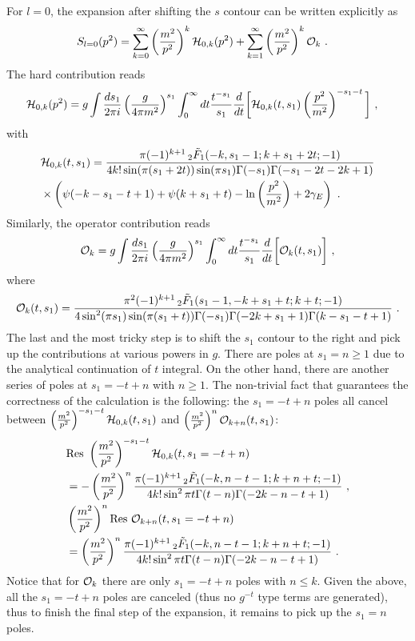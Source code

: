 \documentclass[a4paper,11pt]{article}
\begin{document}
For $l=0$, the expansion after shifting the $s$ contour  can be written explicitly as 
\begin{align}
&S_{l=0}(p^2)=\sum_{k=0}^{\infty}\left(\frac{m^2}{p^2}\right)^k{\cal H}_{0,k}(p^2)+\sum_{k=1}^{\infty}\left(\frac{m^2}{p^2}\right)^k{\cal O}_{k} \ .  
\end{align}
The hard contribution reads
\begin{align}
& {\cal H}_{0,k}(p^2)=g\int\frac{ds_1}{2\pi i}\left(\frac{g}{4\pi m^2}\right)^{s_1}\int_0^{\infty} dt \frac{t^{-s_1}}{s_1}\frac{d}{dt}\bigg[{\cal H}_{0,k}(t,s_1)\left(\frac{p^2}{m^2}\right)^{-s_1-t}\bigg] \ ,
\end{align}
with
\begin{align}
&{\cal H}_{0,k}(t,s_1)=\frac{ \pi  (-1)^{k+1}  \, _2\tilde{F}_1(-k,s_1-1;k+s_1+2 t;-1) }{4k!\sin(\pi  (s_1+2 t)) \sin (\pi  s_1) \Gamma (-s_1) \Gamma (-s_1-2t -2k+1)} \nonumber \\ 
& \times   \left(\psi(-k-s_1-t+1)+\psi (k+s_1+t)-\ln \left(\frac{p^2}{m^2}\right)+2 \gamma_E \right) \ . 
\end{align}
Similarly, the operator contribution reads
\begin{align}
 {\cal O}_{k}=g\int\frac{ds_1}{2\pi i}\left(\frac{g}{4\pi m^2}\right)^{s_1}\int_0^{\infty} dt \frac{t^{-s_1}}{s_1}\frac{d}{dt}\bigg[{\cal O}_{k}(t,s_1)\bigg] \ ,
\end{align}
where
\begin{align}
{\cal O}_{k}(t,s_1)=\frac{\pi ^2 (-1)^{k+1}  \, _2\tilde{F}_1(s_1-1,-k+s_1+t;k+t;-1)}{4\sin^2 (\pi s_1)\sin (\pi(s_1+t))\Gamma (-s_1) \Gamma (-2 k+s_1+1) \Gamma (k-s_1-t+1)} \ . \label{eq:defOkts}
\end{align}
The last and the most tricky step is to shift the $s_1$ contour to the right and pick up the contributions at various powers in $g$. There are poles at $s_1=n\ge 1$ due to the analytical continuation of $t$ integral. On the other hand, there are another series of poles at $s_1=-t+n$ with $n\ge 1$. The non-trivial fact that guarantees the correctness of the calculation is the following: the $s_1=-t+n$ poles all cancel between $\left(\frac{m^2}{p^2}\right)^{-s_1-t}{\cal H}_{0,k}(t,s_1)$ and $\left(\frac{m^2}{p^2}\right)^{n}{\cal O}_{k+n}(t,s_1)$:
\begin{align}
&{\rm Res} \ \left(\frac{m^2}{p^2}\right)^{-s_1-t} {\cal H}_{0,k}(t,s_1=-t+n)\nonumber \\ 
&=-\left(\frac{m^2}{p^2}\right)^n\frac{\pi  (-1)^{k+1}  \, _2\tilde{F}_1(-k,n-t-1;k+n+t;-1)}{4 k! \sin^2\pi t\Gamma (t-n) \Gamma (-2 k-n-t+1)} \ , \\ 
& \left(\frac{m^2}{p^2}\right)^n {\rm Res} \ {\cal O}_{k+n}(t,s_1=-t+n) \nonumber \\ 
&=\left(\frac{m^2}{p^2}\right)^n\frac{\pi  (-1)^{k+1}  \, _2\tilde{F}_1(-k,n-t-1;k+n+t;-1)}{4 k! \sin^2\pi t\Gamma (t-n) \Gamma (-2 k-n-t+1)} \ .
\end{align}
Notice that for ${\cal O}_{k}$ there are only $s_1=-t+n$ poles with $n\le k$. Given the above, all the $s_1=-t+n$ poles are canceled (thus no $g^{-t}$ type terms are generated), thus to finish the final step of the expansion, it remains to pick up the $s_1=n$ poles. 
\end{document}
